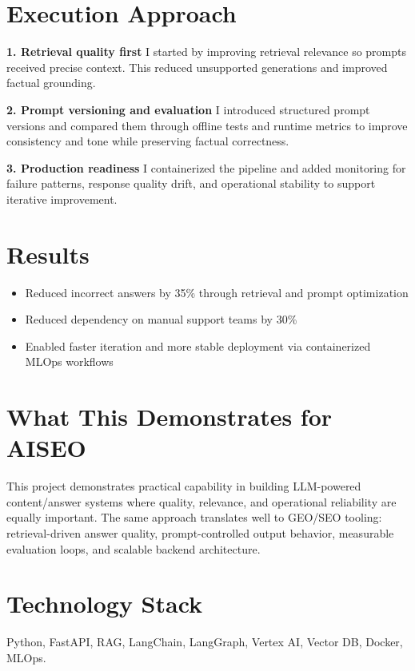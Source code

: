 \documentclass[11pt]{article}
\begin{document}
\section*{Execution Approach}
\textbf{1. Retrieval quality first}
I started by improving retrieval relevance so prompts received precise context. This reduced unsupported generations and improved factual grounding.

\textbf{2. Prompt versioning and evaluation}
I introduced structured prompt versions and compared them through offline tests and runtime metrics to improve consistency and tone while preserving factual correctness.

\textbf{3. Production readiness}
I containerized the pipeline and added monitoring for failure patterns, response quality drift, and operational stability to support iterative improvement.

\section*{Results}
\begin{itemize}[leftmargin=1.2em]
  \item Reduced incorrect answers by 35\% through retrieval and prompt optimization
  \item Reduced dependency on manual support teams by 30\%
  \item Enabled faster iteration and more stable deployment via containerized MLOps workflows
\end{itemize}

\section*{What This Demonstrates for AISEO}
This project demonstrates practical capability in building LLM-powered content/answer systems where quality, relevance, and operational reliability are equally important. The same approach translates well to GEO/SEO tooling: retrieval-driven answer quality, prompt-controlled output behavior, measurable evaluation loops, and scalable backend architecture.

\section*{Technology Stack}
Python, FastAPI, RAG, LangChain, LangGraph, Vertex AI, Vector DB, Docker, MLOps.
\end{document}
